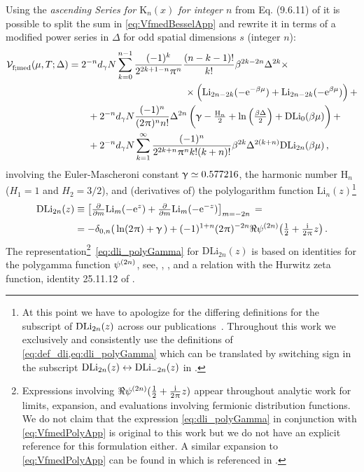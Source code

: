 Using the \textit{ascending  Series for $\mathrm{K}_n(x)$ for integer $n$} from Eq. (9.6.11) of  it is possible to split the sum in \cref{eq:VfmedBesselApp} and rewrite it in terms of a modified power series in $\Delta$ for odd spatial dimensions $s$ (integer $n$):
\begin{align}
	\VeffArgs[\mathrm{f};\med]{\muT;\Delta}&=2^{-n}d_\gamma N \sum_{k=0}^{n-1}\frac{(-1)^k}{2^{2k+1-n}\piu^n}\frac{(n-k-1)!}{k!}\beta^{2k-2n}\Delta^{2k}\times\notag\\
	&\qquad\qquad\qquad\qquad\qquad\qquad\times\del{\mathrm{Li}_{2n-2k}(-\eu^{-\beta\mu})+\mathrm{Li}_{2n-2k}(-\eu^{\beta\mu})} +\notag\\
	&\qquad +2^{-n}d_\gamma N \frac{(-1)^n}{(2\piu)^n n!}\Delta^{2n} \del{\emc -\tfrac{\mathrm{H}_n}{2}+\ln\del{\tfrac{\beta \Delta}{2}}+\mathrm{DLi}_0(\beta \mu)}+ \notag\\
	&\qquad +2^{-n}d_\gamma N\sum_{k=1}^{\infty} \frac{(-1)^n}{2^{2k+n}\piu^n k!(k+n)!}\beta^{2k}\Delta^{2(k+n)}\mathrm{DLi}_{2n}(\beta \mu) \, ,\label{eq:VfmedPolyApp}
\end{align}
involving the Euler-Mascheroni constant $\upgamma\simeq0.577216$, the harmonic number $\mathrm{H}_n$  ($H_1=1$ and $H_2=3/2$), and (derivatives of) the polylogarithm function $\mathrm{Li}_n(z)$\footnote{%
	At this point we have to apologize for the differing definitions for the subscript of $\operatorname{DLi}_{2n} ( z ) $ across our publications~\cite{Stoll:2021ori,Koenigstein:2021llr}.
	Throughout this work we exclusively and consistently use the definitions of \cref{eq:def_dli,eq:dli_polyGamma} which can be translated by switching sign in the subscript $\operatorname{DLi}_{2n} ( z )\leftrightarrow \operatorname{DLi}_{-2n} ( z ) $ in .%
}%
\begin{subequations}
\begin{align}
	\mathrm{DLi}_{2n} ( z ) &\equiv \big[ \tfrac{\partial}{\partial m} \mathrm{Li}_m ( - \eu^{z} ) + \tfrac{\partial}{\partial m} \mathrm{Li}_m ( - \eu^{- z} ) \big]_{m = -2n} \, = \label{eq:def_dli}\\*[.2em] %
	&= -\delta_{0,n}(\,\ln(2\piu)+\emc\,) + (-1)^{1+n} (2\piu)^{-2n}\Re\MFpsi^{(2n)}\big(\tfrac{1}{2}+\tfrac{\iu}{2\piu}z\big) \, . \label{eq:dli_polyGamma}
\end{align}
\end{subequations}
The representation\footnote{%
	Expressions involving $\Re\psi^{(2n)}(\tfrac{1}{2}+\tfrac{\mathrm{i}\mkern1mu}{2\mkern1.0mu\uppi\mkern1.0mu}z)$ appear throughout analytic work for limits, expansion, and evaluations involving fermionic distribution functions.
	We do not claim that the expression \eqref{eq:dli_polyGamma} in conjunction with \cref{eq:VfmedPolyApp} is original to this work but we do not have an explicit reference for this formulation either.
	A similar expansion to \cref{eq:VfmedPolyApp} can be found in  which is referenced in .%
}~\eqref{eq:dli_polyGamma} for $\mathrm{DLi}_{2n} ( z ) $ is based on identities for the polygamma function $\psi^{(2n)}$, see, \eg{}, , and a relation with the Hurwitz zeta function, \cf{} identity 25.11.12 of .
